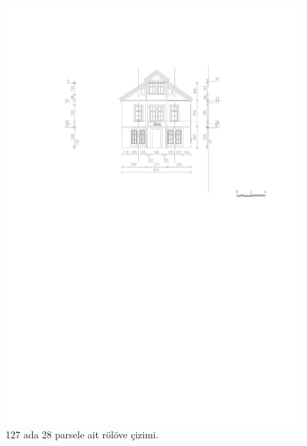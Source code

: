 \begin{figure}
\centering
\includegraphics[width=1\textwidth,height=\textheight]{source/figures/Roloveler/R127-28.pdf}
\caption{127 ada 28 parsele ait rölöve çizimi.}
\end{figure}

